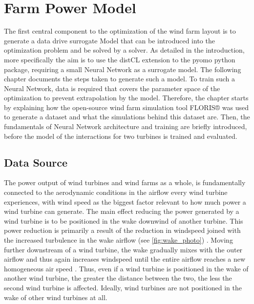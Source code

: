 \chapter{Farm Power Model}\label{chapter:power_model}

The first central component to the optimization of the wind farm layout is to generate a data drive surrogate Model that can be introduced into the optimization problem and be solved by a solver. As detailed in the introduction, more specifically the aim is to use the distCL extension to the pyomo python package, requiring a small Neural Network as a surrogate model. The following chapter documents the steps taken to generate such a model. To train such a Neural Network, data is required that covers the parameter space of the optimization to prevent extrapolation by the model. Therefore, the chapter starts by explaining how the open-source wind farm simulation tool FLORIS® was used to generate a dataset and what the simulations behind this dataset are. Then, the fundamentals of Neural Network architecture and training are briefly introduced, before the model of the interactions for two turbines is trained and evaluated.



\section{Data Source}

The power output of wind turbines and wind farms as a whole, is fundamentally connected to the aerodynamic conditions in the airflow every wind turbine experiences, with wind speed as the biggest factor relevant to how much power a wind turbine can generate. The main effect reducing the power generated by a wind turbine is to be positioned in the wake downwind of another turbine. This power reduction is primarily a result of the reduction in windspeed joined with the increased turbulence in the wake airflow (see \ref{fig:wake_photo})  \cite{KIRANOUDIS1997439}. Moving further downstream of a wind turbine, the wake gradually mixes with the outer airflow and thus again increases windspeed until the entire airflow reaches a new homogeneous air speed \cite{MAGNUSSON1999169}. Thus, even if a wind turbine is positioned in the wake of another wind turbine, the greater the distance between the two, the less the second wind turbine is affected. Ideally, wind turbines are not positioned in the wake of other wind turbines at all. 

